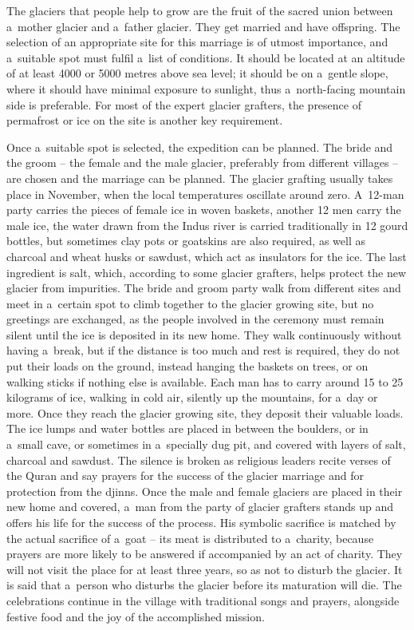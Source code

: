 The glaciers that people help to grow are the fruit of the sacred union between a mother glacier and a father
glacier. They get married and have offspring. The selection of an appropriate site for this marriage is of
utmost importance, and a suitable spot must fulfil a list of conditions. It should be located at an altitude of
at least 4000 or 5000 metres above sea level; it should be on a gentle slope, where it should have minimal
exposure to sunlight, thus a north-facing mountain side is preferable. For most of the expert glacier grafters,
the presence of permafrost or ice on the site is another key requirement. 

Once a suitable spot is selected, the expedition can be planned. The bride and the groom – the female and the
male glacier, preferably from different villages – are chosen and the marriage can be planned. The glacier
grafting usually takes place in November, when the local temperatures oscillate around zero. A 12-man party
carries the pieces of female ice in woven baskets, another 12 men carry the male ice, the water drawn from the
Indus river is carried traditionally in 12 gourd bottles, but sometimes clay pots or goatskins are also
required, as well as charcoal and wheat husks or sawdust, which act as insulators for the ice. The last
ingredient is salt, which, according to some glacier grafters, helps protect the new glacier from impurities.
The bride and groom party walk from different sites and meet in a certain spot to climb together to the glacier
growing site, but no greetings are exchanged, as the people involved in the ceremony must remain silent until
the ice is deposited in its new home. They walk continuously without having a break, but if the distance is too
much and rest is required, they do not put their loads on the ground, instead hanging the baskets on trees, or
on walking sticks if nothing else is available. Each man has to carry around 15 to 25 kilograms of ice, walking
in cold air, silently up the mountains, for a day or more. Once they reach the glacier growing site, they
deposit their valuable loads. The ice lumps and water bottles are placed in between the boulders, or in a small
cave, or sometimes in a specially dug pit, and covered with layers of salt, charcoal and sawdust. The silence is
broken as religious leaders recite verses of the Quran and say prayers for the success of the glacier marriage
and for protection from the djinns. Once the male and female glaciers are placed in their new home and covered,
a man from the party of glacier grafters stands up and offers his life for the success of the process. His
symbolic sacrifice is matched by the actual sacrifice of a goat – its meat is distributed to a charity, because
prayers are more likely to be answered if accompanied by an act of charity. They will not visit the place for at
least three years, so as not to disturb the glacier. It is said that a person who disturbs the glacier before
its maturation will die. The celebrations continue in the village with traditional songs and prayers, alongside
festive food and the joy of the accomplished mission.

